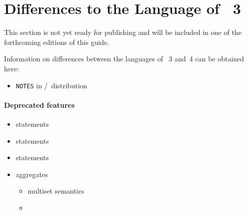 \section{Differences to the Language of \gringo~3}\label{sec:gringo:tri}

This section is not yet ready for publishing
and will be included in one of the forthcoming editions of this guide.

Information on differences between the languages of \gringo~3 and~4 can be obtained here:
\begin{itemize}
\item \texttt{NOTES} in \gringo/\clingo\ distribution
\end{itemize}

\paragraph{Deprecated features}
\begin{itemize}
\item {}    statements
\item {}  statements
\item {} statements
\item aggregates
  \begin{itemize}
  \item multiset semantics
  \item {} 
  \end{itemize}
\end{itemize}

